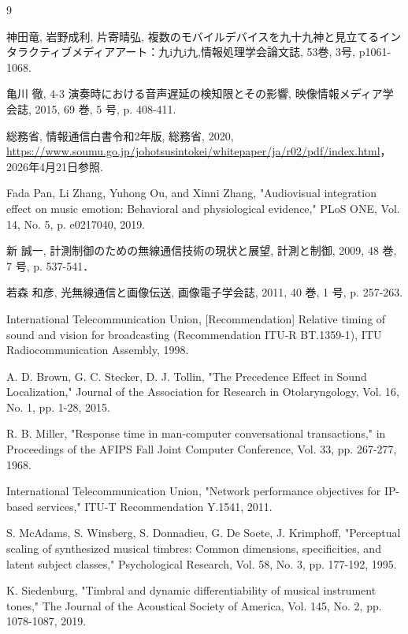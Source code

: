 \documentclass[lualatex,book,openany,paper=a4paper,jafontsize=11.5pt,jafontscale=1.05]{jlreq}
\begin{document}
\begin{thebibliography}{9}

 神田竜, 岩野成利, 片寄晴弘, 複数のモバイルデバイスを九十九神と見立てるインタラクティブメディアアート：九i九i九,情報処理学会論文誌, 53巻, 3号, p1061-1068.

亀川 徹, 4-3 演奏時における音声遅延の検知限とその影響, 映像情報メディア学会誌, 2015, 69 巻, 5 号, p. 408-411.

総務省, 情報通信白書令和2年版, 総務省, 2020, \url{https://www.soumu.go.jp/johotsusintokei/whitepaper/ja/r02/pdf/index.html}， 2026年4月21日参照.

Fada Pan, Li Zhang, Yuhong Ou, and Xinni Zhang, "Audiovisual integration effect on music emotion: Behavioral and physiological evidence," PLoS ONE, Vol. 14, No. 5, p. e0217040, 2019.

 新 誠一, 計測制御のための無線通信技術の現状と展望, 計測と制御, 2009, 48 巻, 7 号, p. 537-541．

 若森 和彦, 光無線通信と画像伝送, 画像電子学会誌, 2011, 40 巻, 1 号, p. 257-263.

International Telecommunication Union, [Recommendation] Relative timing of sound and vision for broadcasting (Recommendation ITU-R BT.1359-1), ITU Radiocommunication Assembly, 1998.

A. D. Brown, G. C. Stecker, D. J. Tollin, "The Precedence Effect in Sound Localization," Journal of the Association for Research in Otolaryngology, Vol. 16, No. 1, pp. 1-28, 2015.

R. B. Miller, "Response time in man-computer conversational transactions," in Proceedings of the AFIPS Fall Joint Computer Conference, Vol. 33, pp. 267-277, 1968.

International Telecommunication Union, "Network performance objectives for IP-based services," ITU-T Recommendation Y.1541, 2011.

S. McAdams, S. Winsberg, S. Donnadieu, G. De Soete, J. Krimphoff, "Perceptual scaling of synthesized musical timbres: Common dimensions, specificities, and latent subject classes," Psychological Research, Vol. 58, No. 3, pp. 177-192, 1995.

K. Siedenburg, "Timbral and dynamic differentiability of musical instrument tones," The Journal of the Acoustical Society of America, Vol. 145, No. 2, pp. 1078-1087, 2019.


\end{thebibliography}
\end{document}
